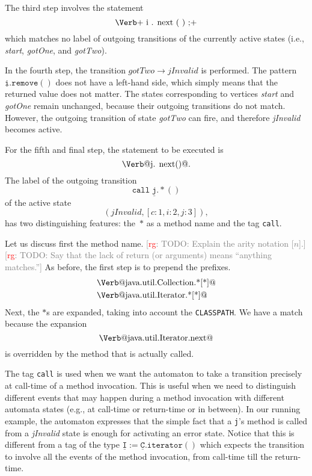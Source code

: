 \documentclass[preprint]{sigplanconf} %
\makeatletter
\newcommand{\note}[2]{\textcolor{gray}{[\textcolor{red}{#1}: #2]}}
\newcommand{\rg}[1]{\note{rg}{#1}}
\newcommand{\verbline}[2][]{\[\text{\Verb@#2@}#1\]}
\newcommand{\pattern}[1]{\mathtt{\underline{#1}}}
\theoremstyle{definition}
\theoremstyle{remark}
\makeatother
\begin{document}
The third step involves the statement 
\[\text{\Verb+\PY{n}{i}\PY{o}{.}\PY{n+na}{next}\PY{o}{(}\PY{o}{)}\PY{o}{;}+}\]
which matches no label of outgoing transitions of the currently active states (i.e., \textit{start}, \textit{gotOne}, and \textit{gotTwo}).


In the fourth step, the transition $\mathit{gotTwo}\to\mathit{jInvalid}$ is performed.
The pattern $\pattern{i}.\mathtt{remove}()$ does not have a left-hand side, which simply means that the returned value does not matter.
The states corresponding to vertices \textit{start} and \textit{gotOne} remain unchanged, because their outgoing transitions do not match.
However,  the outgoing transition of state \textit{gotTwo} can fire, and therefore \textit{jInvalid} becomes active. 

For the fifth and final step, the statement to be executed is \verbline[.]{j.\PY{n+na}{next}()}
The label of the outgoing transition  \[\mathtt{call}\;\pattern{j}.{*}()\] of the active state \[(\mathit{jInvalid},[c:1,i:2,j:3]),\]  
has two distinguishing features: the~$*$ as a method name and the tag \texttt{call}.

Let us discuss first the method name.
\rg{TODO: Explain the arity notation [$n$].}
\rg{TODO: Say that the lack of return (or arguments) means ``anything matches.''}
As before, the first step is to prepend the prefixes.
\begin{align*}
&\text{\Verb@java.util.Collection.*[*]@} \\
&\text{\Verb@java.util.Iterator.*[*]@}
\end{align*}
Next, the $*$s are expanded, taking into account the \texttt{CLASSPATH}.
We have a match because the expansion \verbline{java.util.Iterator.next} is overridden by the method that is actually called.

The tag \texttt{call} is used when we want the automaton to take a transition precisely at call-time of a method invocation.  
This is useful when we need to distinguish different events that may happen during a method invocation with different automata states (e.g., at call-time or return-time or in between). 
In our running example, the automaton expresses that the simple fact that a {\tt j}'s method is called from a \textit{jInvalid} state is enough for activating an error state. Notice that this is different from a tag of the type $\pattern I:=\pattern C.\mathtt{iterator}()$ which expects the transition to involve all the events of the method invocation, from call-time till the return-time. 
\end{document}
